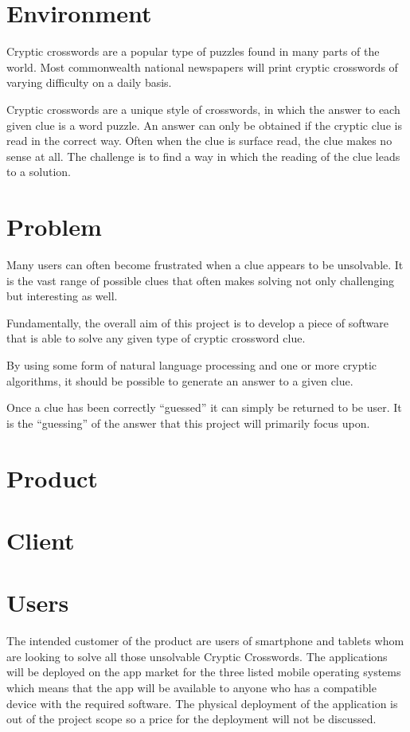\section{Environment}

Cryptic crosswords are a popular type of puzzles found in many parts of the 
world. Most commonwealth national newspapers will print cryptic crosswords of 
varying difficulty on a daily basis.

Cryptic crosswords are a unique style of crosswords, in which the answer to 
each given clue is a word puzzle. An answer can only be obtained if the cryptic
clue is read in the correct way. Often when the clue is surface read, the clue 
makes no sense at all. The challenge is to find a way in which the reading of 
the clue leads to a solution.


\section{Problem}

Many users can often become frustrated when a clue appears to be unsolvable. It
is the vast range of possible clues that often makes solving not only 
challenging but interesting as well.

Fundamentally, the overall aim of this project is to develop a piece of 
software that is able to solve any given type of cryptic crossword clue.

By using some form of natural language processing and one or more cryptic 
algorithms, it should be possible to generate an answer to a given clue.

Once a clue has been correctly ``guessed'' it can simply be returned to be 
user. It is the ``guessing'' of the answer that this project will primarily 
focus upon.

\section{Product}


\section{Client}


\section{Users}
The intended customer of the product are users of smartphone and tablets whom are looking to solve all those unsolvable Cryptic Crosswords. The applications will be deployed on the app market for the three listed mobile operating systems which means that the app will be available to anyone who has a compatible device with the required software. The physical deployment of the application is out of the project scope so a price for the deployment will not be discussed.

